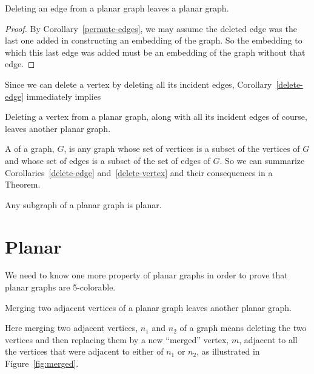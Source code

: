 \begin{corollary}\label{delete-edge}
Deleting an edge from a planar graph leaves a planar graph.

\begin{proof}
  By Corollary~\ref{permute-edges}, we may assume the deleted edge was the
  last one added in constructing an embedding of the graph.  So the
  embedding to which this last edge was added must be an embedding of the
  graph without that edge.
\end{proof}

\end{corollary}

Since we can delete a vertex by deleting all its incident edges,
Corollary~\ref{delete-edge} immediately implies

\begin{corollary}\label{delete-vertex}
Deleting a vertex from a planar graph, along with all its incident
edges of course, leaves another planar graph.
\end{corollary}

A  of a graph, $G$, is any graph whose set of vertices is a
subset of the vertices of $G$ and whose set of edges is a subset of the
set of edges of $G$.  So we can summarize Corollaries~\ref{delete-edge}
and~\ref{delete-vertex} and their consequences in a Theorem.

\begin{theorem}\label{planar-subgraph}
  Any subgraph of a planar graph is planar.
\end{theorem}

\section{Planar }

We need to know one more property of planar graphs in order to prove that
planar graphs are 5-colorable.

\begin{lemma}\label{mergelem}
Merging two adjacent vertices of a planar graph leaves another planar graph.
\end{lemma}

Here merging two adjacent vertices, $n_1$ and $n_2$ of a graph means
deleting the two vertices and then replacing them by a new ``merged''
vertex, $m$, adjacent to all the vertices that were adjacent to either of
$n_1$ or $n_2$, as illustrated in Figure~\ref{fig:merged}.

